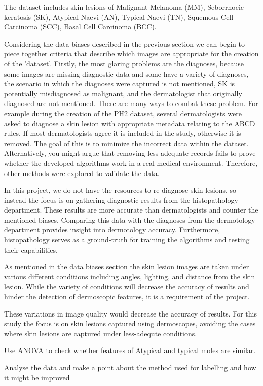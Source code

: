 The dataset includes skin lesions of Malignant Melanoma (MM), Seborrhoeic keratosis (SK), Atypical Naevi (AN), Typical Naevi (TN), Squemous Cell Carcinoma (SCC), Basal Cell Carcinoma (BCC). 

Considering the data biases described in the previous section we can begin to piece together criteria that describe which images are appropriate for the creation of the 'dataset'. Firstly, the most glaring problems are the diagnoses, because some images are missing diagnostic data and some have a variety of diagnoses, the scenario in which the diagnoses were captured is not mentioned, 
SK is potentially misdiagnosed as malignant, and the dermatologist that originally diagnosed are not mentioned. There are many ways to combat these problem. For example during the creation of the PH2 dataset\cite{mendonca2013}, several dermatologists were asked to diagnose a skin lesion with appropriate metadata relating to the ABCD rules. If most dermatologists agree it is included in the study, otherwise it is removed. The goal of this is to minimize the incorrect data within the dataset. Alternatively, you might argue that removing less adequate records fails to prove whether the developed algorithms work in a real medical environment. Therefore, other methods were explored to validate the data.

In this project, we do not have the resources to re-diagnose skin lesions, so instead the focus is on gathering diagnostic results from the histopathology department. These results are more accurate than dermatologists\cite{} and counter the mentioned biases. Comparing this data with the diagnoses from the dermotology department provides insight into dermotology accuracy. Furthermore, histopathology serves as a ground-truth for training the algorithms and testing their capabilities.

As mentioned in the data biases section the skin lesion images are taken under various different conditions including angles, lighting, and distance from the skin lesion. While the variety of conditions will decrease the accuracy of results and hinder the detection of dermoscopic features, it is a requirement of the project. 

These variations in image quality would decrease the accuracy of results. For this study the focus is on skin lesions captured using dermoscopes, avoiding the cases where skin lesions are captured under less-adequte conditions.

Use ANOVA to check whether features of Atypical and typical moles are similar.







Analyse the data and make a point about the method used for labelling and how it might be improved
